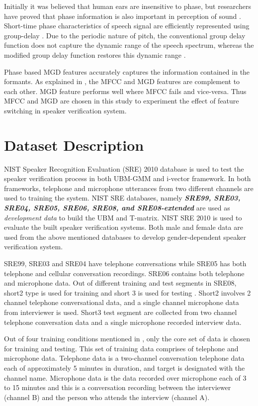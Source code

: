 \documentclass{article}
\begin{document}
Initially it was believed that human ears are insensitive to phase, but researchers have  proved that phase information is also important in perception of sound \cite{shi}.  Short-time phase characteristics of speech signal are efficiently represented using group-delay \cite{group_delay}. Due to the periodic nature of pitch, the conventional group delay function does not capture the dynamic range of the speech spectrum, whereas the modified group delay function restores this dynamic range \cite{hema_gds}.

Phase based MGD features accurately captures the information contained in the formants.  As explained in  \cite{mgd_complement}, the MFCC and MGD features are complement to each other. MGD feature performs well where MFCC fails and vice-versa. Thus MFCC and MGD are chosen in this study to experiment the effect of feature switching in speaker verification system.

\section{Dataset Description}
\label{sec:dB}
NIST Speaker Recognition Evaluation (SRE) 2010 database is used to test the speaker verification process in both UBM-GMM and i-vector framework. In both frameworks, telephone and microphone utterances from two different channels are used to training  the system. NIST SRE databases, namely {\bf {\it SRE99, SRE03, SRE04, SRE05, SRE06, SRE08, and SRE08-extended}} are used as {\it { development data}} to build the UBM and T-matrix. NIST SRE 2010 is used to evaluate the built speaker verification systems. Both male and female data are used from the above mentioned databases to develop gender-dependent speaker verification system.

\vspace{0.25cm}
SRE99, SRE03 and SRE04 have telephone conversations while SRE05 has both telephone and cellular conversation recordings. SRE06 contains both telephone and microphone data. Out of different training  and test segments in SRE08, short2 type is used for training and short 3 is used for testing  \cite{sre2008}. Short2 involves 2 channel telephone conversational data, and a single channel microphone data from interviewer is used. Short3 test segment are collected from two channel telephone conversation data and a single microphone recorded interview data. 

\vspace{0.25cm}
Out of four training  conditions mentioned in  \cite{sre2010}, only the core set of data is chosen for training and testing. This set of training data comprises of telephone and microphone data. Telephone data is a two-channel conversation telephone data each of approximately 5 minutes in duration, and target is designated with the channel name.  Microphone data is the data recorded over microphone each of 3 to 15 minutes and this is a conversation recording between the interviewer (channel B) and the person who attends the interview (channel A).  
\end{document}
